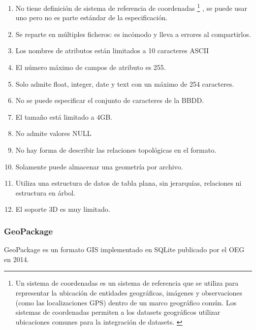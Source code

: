 \begin{enumerate} 
    \item No tiene definición de sistema de referencia de coordenadas \footnote{Un sistema de
            coordenadas es un sistema de referencia que se utiliza para representar la ubicación de entidades
            geográficas, imágenes y observaciones (como las localizaciones GPS) dentro de un marco geográfico
            común. Los sistemas de coordenadas permiten a los datasets geográficos utilizar ubicaciones comunes
            para la integración de datasets. \cite{coordenadas}} 
        , se puede usar uno pero no es parte estándar de la especificación.     
    \item Se reparte en múltiples ficheros: es incómodo y lleva a errores al compartirlos.
    \item Los nombres de atributos están limitados a 10 caracteres ASCII 
    \item El número máximo de campos de atributo es 255.  
    \item Solo admite float, integer, date y text con un máximo de 254 caracteres.  
    \item No se puede especificar el conjunto de caracteres de la BBDD.  
    \item El tamaño está limitado a 4GB.  
    \item No admite valores NULL 
    \item No hay forma de describir las relaciones topológicas en el formato.  
    \item Solamente puede almacenar una geometría por archivo.  
    \item Utiliza una estructura de datos de tabla plana, sin jerarquías, relaciones ni estructura en árbol.  
    \item El soporte 3D es muy limitado.  
\end{enumerate}

\subsubsection{GeoPackage}
GeoPackage es un formato GIS implementado en SQLite publicado por el OEG en 2014. \cite{geopackage-spec}
    

